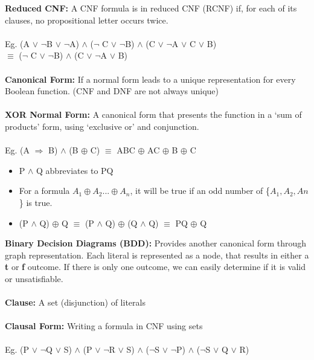 \documentclass[a4paper,10pt]{article}
\begin{document}
\noindent \textcolor{RoyalPurple}{\textbf{Reduced CNF:}} A CNF formula is in reduced CNF (RCNF) if, for each of its clauses, no propositional letter occurs twice. \\ \\
\indent Eg. (A $\lor$ $\neg$B $\lor$ $\neg$A) $\land$ ($\neg$ C $\lor$ $\neg$B) $\land$ (C $\lor$ $\neg$A $\lor$ C $\lor$ B) \\
\indent \indent $\equiv$ ($\neg$ C $\lor$ $\neg$B) $\land$ (C $\lor$ $\neg$A $\lor$ B) \\\\
\noindent \textcolor{RoyalPurple}{\textbf{Canonical Form:}} If a normal form leads to a unique representation for every Boolean function. (CNF and DNF are not always unique)\\ \\
\noindent \textcolor{RoyalPurple}{\textbf{XOR Normal Form:}} A canonical form that presents the function in a `sum of products' form, using `exclusive or' and conjunction. \\\\
Eg. (A $\Rightarrow$ B) $\land$ (B $\oplus$ C) $\equiv$ ABC $\oplus$ AC $\oplus$ B $\oplus$ C
\renewcommand{\labelitemi}{\textperiodcentered}
\begin{itemize} 
\item P $\land$ Q abbreviates to PQ 
\item For a formula $A_{1} \oplus A_{2} ... \oplus A_{n}$, it will be true if an odd number of \{$A_{1}, A_{2}, A{n}$\} is true.
\item (P $\land$ Q) $\oplus$ Q $\equiv$ (P $\land$ Q) $\oplus$ (Q $\land$ Q) $\equiv$ PQ $\oplus$ Q \\
\end{itemize} 
\noindent \textcolor{RoyalPurple}{\textbf{Binary Decision Diagrams (BDD):}} Provides another canonical form through graph representation. Each literal is represented as a node, that results in either a \textbf{t} or \textbf{f} outcome. If there is only one outcome, we can easily determine if it is valid or unsatisfiable.\\ \\
\newpage
\noindent \textcolor{RoyalPurple}{\textbf{Clause:}} A set (disjunction) of literals \\ \\
\noindent \textcolor{RoyalPurple}{\textbf{Clausal Form:}} Writing a formula in CNF using sets\\ \\
\indent Eg. (P $\lor$ $\neg$Q $\lor$ S) $\land$ (P $\lor$ $\neg$R $\lor$ S) $\land$ ($\neg$S $\lor$ $\neg$P) $\land$ ($\neg$S $\lor$ Q $\lor$ R) \\ \\
\end{document}
